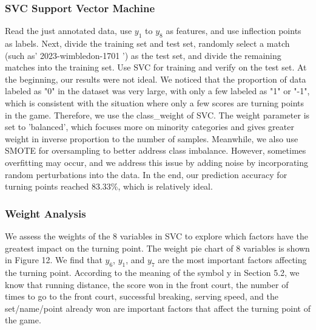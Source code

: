 \documentclass{mcmthesis}
\begin{document}
\subsubsection{SVC Support Vector Machine}
Read the just annotated data, use $y_1$ to $y_8$ as features, and use inflection points as labels. Next, divide the training set and test set, randomly select a match (such as' 2023-wimbledon-1701 ') as the test set, and divide the remaining matches into the training set. Use SVC for training and verify on the test set. At the beginning, our results were not ideal. We noticed that the proportion of data labeled as "0" in the dataset was very large, with only a few labeled as "1" or "-1", which is consistent with the situation where only a few scores are turning points in the game. Therefore, we use the class\_weight of SVC. The weight parameter is set to 'balanced', which focuses more on minority categories and gives greater weight in inverse proportion to the number of samples. Meanwhile, we also use SMOTE for oversampling to better address class imbalance. However, sometimes overfitting may occur, and we address this issue by adding noise by incorporating random perturbations into the data. In the end, our prediction accuracy for turning points reached 83.33\%, which is relatively ideal.

\subsubsection{Weight Analysis}
We assess the weights of the 8 variables in SVC to explore which factors have the greatest impact on the turning point. The weight pie chart of 8 variables is shown in Figure 12. We find that $y_6$, $y_1$, and $y_7$ are the most important factors affecting the turning point. According to the meaning of the symbol y in Section 5.2, we know that running distance, the score won in the front court, the number of times to go to the front court, successful breaking, serving speed, and the set/name/point already won are important factors that affect the turning point of the game.
\end{document}
